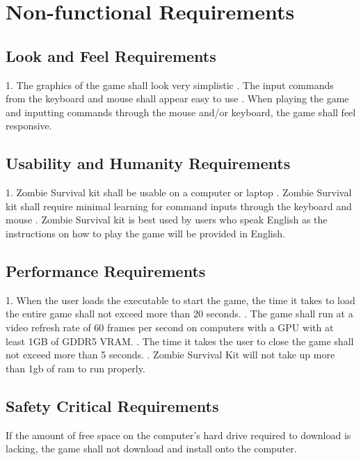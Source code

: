 \documentclass[12pt, titlepage]{article}
\begin{document}
\section{Non-functional Requirements}

\subsection{Look and Feel Requirements}
1. The graphics of the game shall look very simplistic
. The input commands from the keyboard and mouse shall appear easy to use
. When playing the game and inputting commands through the mouse and/or keyboard, the game shall feel responsive.

\subsection{Usability and Humanity Requirements}
1. Zombie Survival kit shall be usable on a computer or laptop
. Zombie Survival kit shall require minimal learning for command inputs through the keyboard and mouse
. Zombie Survival kit is best used by users who speak English as the instructions on how to play the game will be provided in English. 

\subsection{Performance Requirements}
1. When the user loads the executable to start the game, the time it takes to load the entire game shall not exceed more than 20 seconds.
. The game shall run at a video refresh rate of 60 frames per second on computers with a GPU with at least 1GB of GDDR5 VRAM.
. The time it takes the user to close the game shall not exceed more than 5 seconds.
. Zombie Survival Kit will not take up more than 1gb of ram to run properly.

\subsection{Safety Critical Requirements}
If the amount of free space on the computer’s hard drive required to download is lacking, the game shall not download and install onto the computer.
\end{document}
